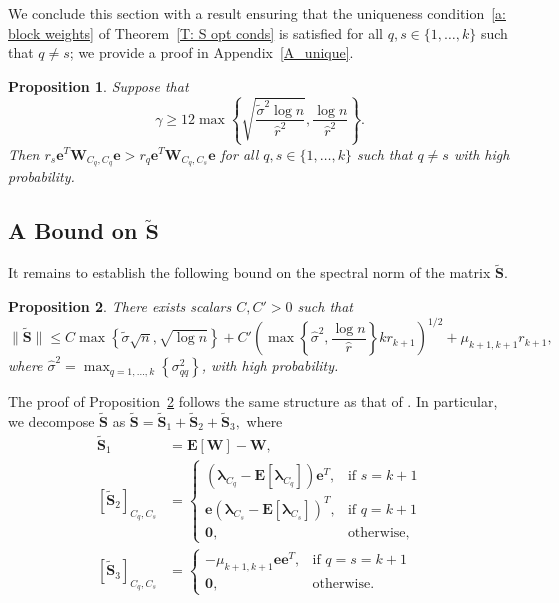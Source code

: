 \documentclass[twoside,11pt]{article}
\newtheorem{proposition}{Proposition}[section]
\newcommand{\E}{\mathbf{E}}
\newcommand{\St}{\bs{\tilde S}}
\newcommand{\e}{\bs {e}}
\newcommand{\bs}{\boldsymbol}
\newcommand{\W}{\bs {W}}
\newcommand{\0}{\bs{0}}
\newcommand{\sbra}[1] {\ensuremath{ \left[ #1\right]}} %
\newcommand{\rbra}[1]{\ensuremath{\left( #1 \right)}} %
\newcommand{\bra}[1]{\ensuremath{\left\{ #1 \right\}}} %
\begin{document}
{%
We conclude this section with a result ensuring that the uniqueness condition~\eqref{a: block weights} of
Theorem~\ref{T: S opt conds}
is satisfied for all \(q, s\in \{1,\dots, k\}\) such that \(q \neq s\);
we provide a proof in Appendix~\ref{A_unique}.

\begin{proposition}
\label{prop:unique}%
	Suppose that
	\begin{equation} \label{eq: unique bound}
		\gamma \ge
		12 \max \bra{ \sqrt{ \frac{\tilde \sigma^2 \log n}{\hat r^2}},
		\frac{\log n}{\hat r^2} }.
	\end{equation}
	Then \(r_s \e^T \W_{C_q, C_q} \e > r_q \e^T \W_{C_q, C_s} \e \)
	for all \(q,s \in \{1,\dots, k\}\) such that \(q \neq s\) with high probability.
\end{proposition}

\subsection{A Bound on \(\bs{\tilde S}\)}
\label{sec: S}
It remains to establish the following bound on the spectral norm of the matrix \(\St\).

\begin{proposition} \label{prop: S bound}
	There exists scalars $C, C' > 0$ such that
	\begin{equation} \label{eq: S bound}
	\|\St\| \leq C   \max  \bra {\tilde \sigma\sqrt{n},  \sqrt{\log n}}
	+ C' \rbra{ \max \bra{\hat\sigma^2, \frac{\log n}{\hat r} } k r_{k+1} }^{1/2}
	+ \mu_{k+1, k+1} r_{k+1},
\end{equation}
	where $\hat \sigma^2 = \max_{q=1,\dots,k}\bra{\sigma^{2}_{qq}}$,
	with high probability.
\end{proposition}

The proof of Proposition~\ref{prop: S bound} follows the same structure as that of  \citet[Lemma~4.5]{ames2014guaranteed}.
In particular, we decompose \(\St\) as \(\St = \St_1 + \St_2 + \St_3,\) where
\begin{align}
\St_1 & = \E[ \W ] - \W,  \label{eq: St1 def}\\
[\St_2]_{C_q, C_s} & =
\begin{cases}  \left(\bs{\lambda}_{C_q}-\E\sbra{\bs{\lambda}_{C_q}}\right)\bs{e}^T,
& \mbox{if } s = k+1 \\
\bs{e}\left(\bs{\lambda}_{C_s}-\E\sbra{\bs{\lambda}_{C_s}}\right)^T, & \mbox{if } q = k+1  \\
\bs{0}, & \mbox{otherwise, }\end{cases} \label{eq: St2 def} \\
[\St_3]_{C_q, C_s} &= 	\begin{cases} -\mu_{k+1, k+1} \bs{e}\bs{e}^T, & \mbox{if } q=s=k+1 \\
\bs{0}, & \mbox{otherwise.} \end{cases}
\end{align}

}
\end{document}
